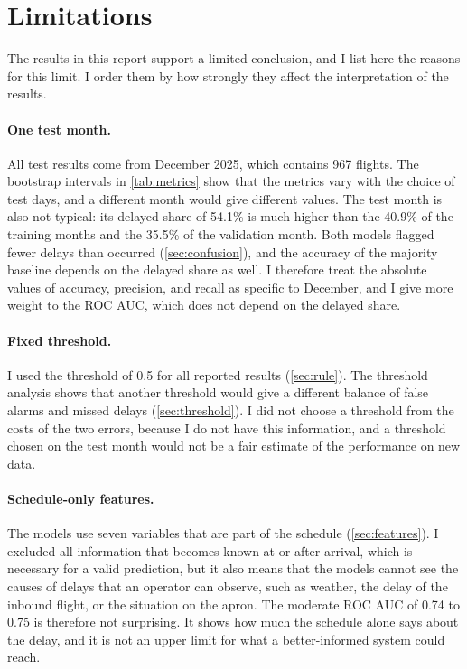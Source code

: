 \section{Limitations}\label{sec:limitations}

The results in this report support a limited conclusion, and I list here the reasons for this limit. I order them by how strongly they affect the interpretation of the results.

\paragraph{One test month.} All test results come from December 2025, which contains 967 flights. The bootstrap intervals in \cref{tab:metrics} show that the metrics vary with the choice of test days, and a different month would give different values. The test month is also not typical: its delayed share of 54.1\% is much higher than the 40.9\% of the training months and the 35.5\% of the validation month. Both models flagged fewer delays than occurred (\cref{sec:confusion}), and the accuracy of the majority baseline depends on the delayed share as well. I therefore treat the absolute values of accuracy, precision, and recall as specific to December, and I give more weight to the ROC AUC, which does not depend on the delayed share.

\paragraph{Fixed threshold.} I used the threshold of 0.5 for all reported results (\cref{sec:rule}). The threshold analysis shows that another threshold would give a different balance of false alarms and missed delays (\cref{sec:threshold}). I did not choose a threshold from the costs of the two errors, because I do not have this information, and a threshold chosen on the test month would not be a fair estimate of the performance on new data.

\paragraph{Schedule-only features.} The models use seven variables that are part of the schedule (\cref{sec:features}). I excluded all information that becomes known at or after arrival, which is necessary for a valid prediction, but it also means that the models cannot see the causes of delays that an operator can observe, such as weather, the delay of the inbound flight, or the situation on the apron. The moderate ROC AUC of 0.74 to 0.75 is therefore not surprising. It shows how much the schedule alone says about the delay, and it is not an upper limit for what a better-informed system could reach.

